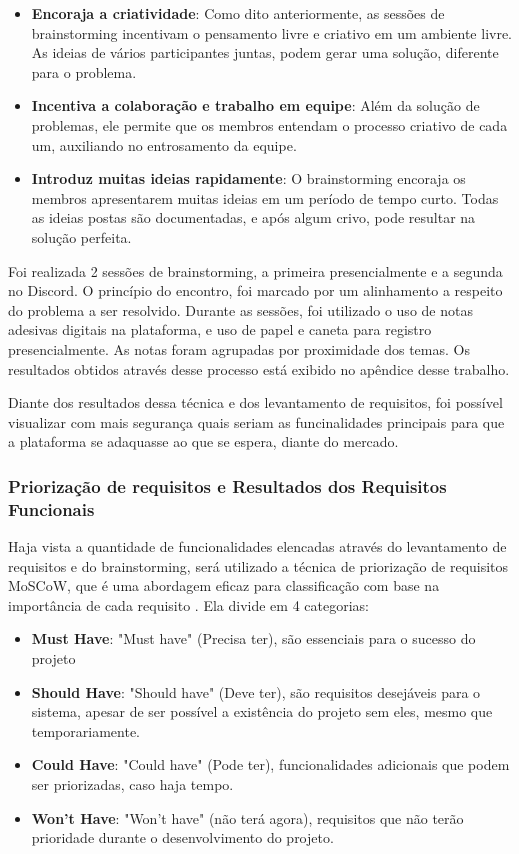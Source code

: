         \begin{itemize}
            \item \textbf{Encoraja a criatividade}: Como dito anteriormente, as sessões de brainstorming incentivam o pensamento livre e criativo em um ambiente livre. As ideias de vários participantes juntas, podem gerar uma solução, diferente para o problema.
            \item \textbf{Incentiva a colaboração e trabalho em equipe}: Além da solução de problemas, ele permite que os membros entendam o processo criativo de cada um, auxiliando no entrosamento da equipe.
            \item \textbf{Introduz muitas ideias rapidamente}: O brainstorming encoraja os membros apresentarem muitas ideias em um período de tempo curto. Todas as ideias postas são documentadas, e após algum crivo, pode resultar na solução perfeita.
        \end{itemize}

        Foi realizada 2 sessões de brainstorming, a primeira presencialmente e a segunda no Discord. O princípio do encontro, foi marcado por um alinhamento a respeito do problema a ser resolvido. Durante as sessões, foi utilizado o uso de notas adesivas digitais na plataforma, e uso de papel e caneta para registro presencialmente. As notas foram agrupadas por proximidade dos temas. Os resultados obtidos através desse processo está exibido no apêndice desse trabalho. 

        Diante dos resultados dessa técnica e dos levantamento de requisitos, foi possível visualizar com mais segurança quais seriam as funcinalidades principais para que a plataforma se adaquasse ao que se espera, diante do mercado.


        \subsubsection{Priorização de requisitos e Resultados dos Requisitos Funcionais}
        \label{sec:priorizacao}
        Haja vista a quantidade de funcionalidades elencadas através do levantamento de requisitos e do brainstorming, será utilizado a técnica de priorização de requisitos MoSCoW, que é uma abordagem eficaz para classificação com base na importância de cada requisito \cite{cottrell1999}. Ela divide em 4 categorias:

        \begin{itemize}
            \item \textbf{Must Have}: "Must have" (Precisa
            ter), são essenciais para o sucesso do projeto
            \item \textbf{Should Have}: "Should have" (Deve ter), são requisitos desejáveis para o sistema, apesar de ser possível a existência do projeto sem eles, mesmo que temporariamente.
            \item \textbf{Could Have}: "Could have" (Pode ter), funcionalidades adicionais que podem ser priorizadas, caso haja tempo.
            \item \textbf{Won’t Have}: "Won’t have" (não terá agora), requisitos que não terão prioridade durante o desenvolvimento do projeto.
        \end{itemize}

